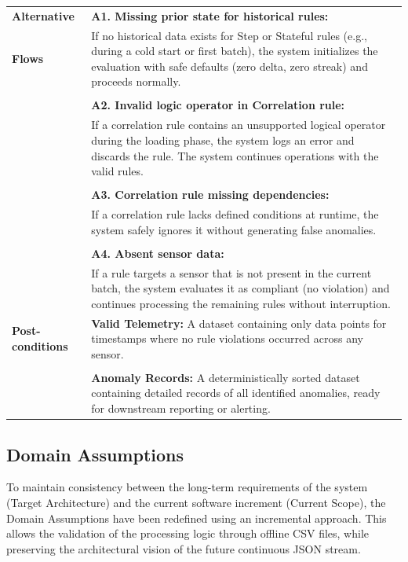 \documentclass[11pt, a4paper]{article}
\begin{document}
\begin{longtable}{|p{3.5cm}|p{10.5cm}|}
\textbf{Alternative} & \textbf{A1. Missing prior state for historical rules:} \\
\textbf{Flows} & If no historical data exists for Step or Stateful rules (e.g., during a cold start or first batch), the system initializes the evaluation with safe defaults (zero delta, zero streak) and proceeds normally. \\
& \\
& \textbf{A2. Invalid logic operator in Correlation rule:} \\
& If a correlation rule contains an unsupported logical operator during the loading phase, the system logs an error and discards the rule. The system continues operations with the valid rules. \\
& \\
& \textbf{A3. Correlation rule missing dependencies:} \\
& If a correlation rule lacks defined conditions at runtime, the system safely ignores it without generating false anomalies. \\
& \\
& \textbf{A4. Absent sensor data:} \\
& If a rule targets a sensor that is not present in the current batch, the system evaluates it as compliant (no violation) and continues processing the remaining rules without interruption. \\ \hline

\textbf{Post-conditions} & \textbf{Valid Telemetry:} A dataset containing only data points for timestamps where no rule violations occurred across any sensor. \\
& \\
& \textbf{Anomaly Records:} A deterministically sorted dataset containing detailed records of all identified anomalies, ready for downstream reporting or alerting. \\ \hline

\end{longtable}

\newpage
\subsection{Domain Assumptions}

To maintain consistency between the long-term requirements of the system (Target Architecture) and the current software increment (Current Scope), the Domain Assumptions have been redefined using an incremental approach. This allows the validation of the processing logic through offline CSV files, while preserving the architectural vision of the future continuous JSON stream.
\end{document}
